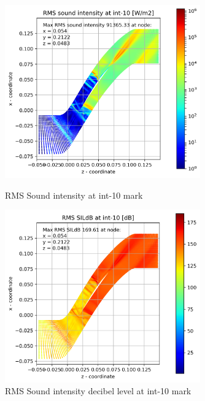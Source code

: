 \begin{figure}[ht]
  \centering
  \includegraphics[width=0.75\textwidth]{Figures/int-10-rms-sil.png}
  \caption{RMS Sound intensity at int-10 mark} \label{int-10-rms-sil}
  
  \vspace*{\floatsep}%

  \includegraphics[width=0.75\textwidth]{Figures/int-10-rms-sildb.png}
  \caption{RMS Sound intensity decibel level at int-10 mark} \label{int-10-rms-sildb}
\end{figure}


